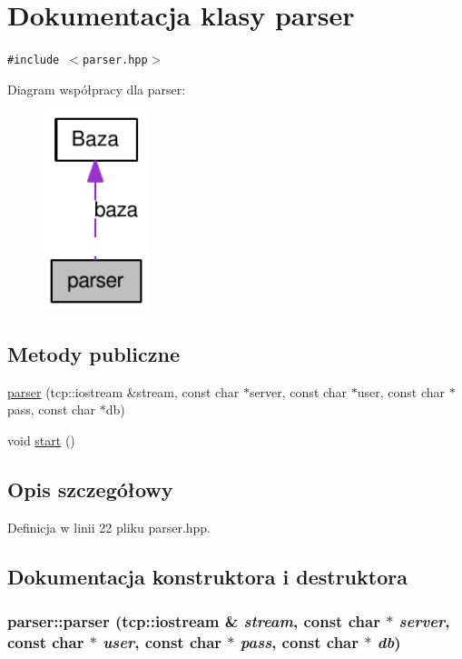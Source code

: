 \hypertarget{classparser}{
\section{Dokumentacja klasy parser}
\label{classparser}
}
{\tt \#include $<$parser.hpp$>$}

Diagram współpracy dla parser:\nopagebreak
\begin{figure}[H]
\begin{center}
\leavevmode
\includegraphics[width=86pt]{classparser__coll__graph}
\end{center}
\end{figure}
\subsection*{Metody publiczne}
\begin{CompactItemize}
\item 
\hyperlink{classparser_3a237071a3ab764cd61bc53df9dd4f46}{parser} (tcp::iostream \&stream, const char $\ast$server, const char $\ast$user, const char $\ast$pass, const char $\ast$db)
\item 
void \hyperlink{classparser_7793913f528921aa22c4b6cc259a0a14}{start} ()
\end{CompactItemize}


\subsection{Opis szczegółowy}


Definicja w linii 22 pliku parser.hpp.

\subsection{Dokumentacja konstruktora i destruktora}
\hypertarget{classparser_3a237071a3ab764cd61bc53df9dd4f46}{
\subsubsection[{parser}]{\setlength{\rightskip}{0pt plus 5cm}parser::parser (tcp::iostream \& {\em stream}, \/  const char $\ast$ {\em server}, \/  const char $\ast$ {\em user}, \/  const char $\ast$ {\em pass}, \/  const char $\ast$ {\em db})}}
\label{classparser_3a237071a3ab764cd61bc53df9dd4f46}





